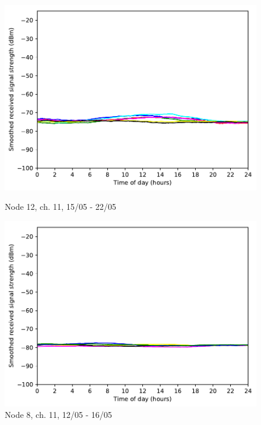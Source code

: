 \documentclass[a4paper, 11pt]{article}
\begin{document}
\begin{figure}
\begin{minipage}{0.47\textwidth}
	\includegraphics[width=\textwidth]{images/2_4_GHz/cot-node12-student_2017-05-22_chan11_image}
    \caption{Node 12, ch. 11, 15/05 - 22/05} \label{node12-11}
\end{minipage}\hfill
\begin{minipage}{0.47\textwidth}
    \centering
	\includegraphics[width=\textwidth]{images/2_4_GHz/cot-node8-student_2017-05-16_chan11_image}
    \caption{Node 8, ch. 11, 12/05 - 16/05} \label{node8-11}
\end{minipage}\hfill
\end{figure}
\end{document}
